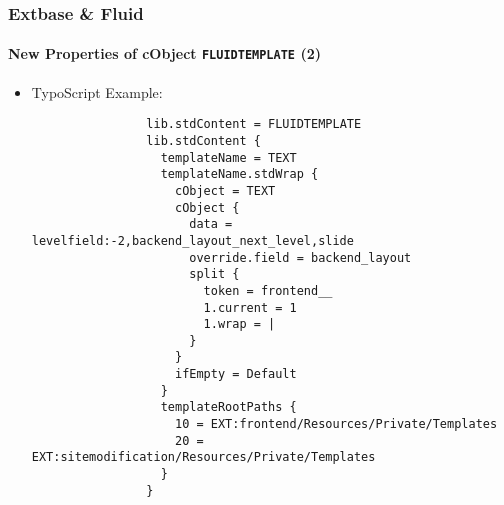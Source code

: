 \begin{frame}[fragile]
	\frametitle{Extbase \& Fluid}
	\framesubtitle{New Properties of cObject \texttt{FLUIDTEMPLATE} (2)}

	\lstset{basicstyle=\tiny\ttfamily}

	\begin{itemize}

		\item TypoScript Example:

			\begin{lstlisting}
				lib.stdContent = FLUIDTEMPLATE
				lib.stdContent {
				  templateName = TEXT
				  templateName.stdWrap {
				    cObject = TEXT
				    cObject {
				      data = levelfield:-2,backend_layout_next_level,slide
				      override.field = backend_layout
				      split {
				        token = frontend__
				        1.current = 1
				        1.wrap = |
				      }
				    }
				    ifEmpty = Default
				  }
				  templateRootPaths {
				    10 = EXT:frontend/Resources/Private/Templates
				    20 = EXT:sitemodification/Resources/Private/Templates
				  }
				}
			\end{lstlisting}

	\end{itemize}

\end{frame}



